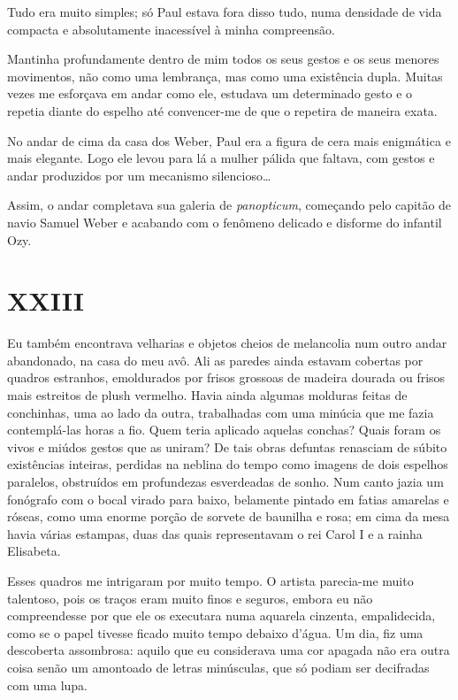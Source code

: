 Tudo era muito simples; só Paul estava fora disso tudo, numa densidade de vida compacta e absolutamente inacessível à minha compreensão.

Mantinha profundamente dentro de mim todos os seus gestos e os seus menores movimentos, não como uma lembrança, mas como uma existência dupla. Muitas vezes me esforçava em andar como ele, estudava um determinado gesto e o repetia diante do espelho até convencer-me de que o repetira de maneira exata.

No andar de cima da casa dos Weber, Paul era a figura de cera mais enigmática e mais elegante. Logo ele levou para lá a mulher pálida que faltava, com gestos e andar produzidos por um mecanismo silencioso\dots

Assim, o andar completava sua galeria de \textit{panopticum}, começando pelo capitão de navio Samuel Weber e acabando com o fenômeno delicado e disforme do infantil Ozy.


\chapter*{\centering\Large{XXIII}}

Eu também encontrava velharias e objetos cheios de melancolia num outro andar abandonado, na casa do meu avô. Ali as paredes ainda estavam cobertas por quadros estranhos, emoldurados por frisos grossoas de madeira dourada ou frisos mais estreitos de plush vermelho. Havia ainda algumas molduras feitas de conchinhas, uma ao lado da outra, trabalhadas com uma minúcia que me fazia contemplá-las horas a fio. Quem teria aplicado aquelas conchas? Quais foram os vivos e miúdos gestos que as uniram? De tais obras defuntas renasciam de súbito existências inteiras, perdidas na neblina do tempo como imagens de dois espelhos paralelos, obstruídos em profundezas esverdeadas de sonho.
Num canto jazia um fonógrafo com o bocal virado para baixo, belamente pintado em fatias amarelas e róseas, como uma enorme porção de sorvete de baunilha e rosa; em cima da mesa havia várias estampas, duas das quais representavam o rei Carol I e a rainha Elisabeta.

Esses quadros me intrigaram por muito tempo. O artista parecia-me muito talentoso, pois os traços eram muito finos e seguros, embora eu não compreendesse por que ele os executara numa aquarela cinzenta, empalidecida, como se o papel tivesse ficado muito tempo debaixo d’água.
Um dia, fiz uma descoberta assombrosa: aquilo que eu considerava uma cor apagada não era outra coisa senão um amontoado de letras minúsculas, que só podiam ser decifradas com uma lupa.

